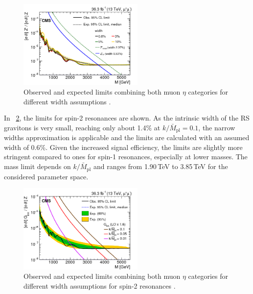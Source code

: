 \begin{figure}[htbp]
\centering
\includegraphics[width=0.55\textwidth]{Images/Cap5/Limit_mm_widths}
\caption{Observed and expected limits combining both muon $\eta$ categories for different width assumptions \cite{PAS}.}
\label{fig:limitWidths}
\end{figure}
 
In \figurename~\ref{fig:limitSpin2}, the limits for spin-2 resonances are shown. As the intrinsic width of the RS gravitons is very small, reaching only about 1.4\% at $k/\bar{M}_{\mathrm{pl}} = 0.1$, the narrow widths approximation is applicable and the limits are calculated with an assumed width of 0.6\%. Given the increased signal efficiency, the limits are slightly more stringent compared to ones for spin-1 resonances, especially at lower masses. The mass limit depends on $k/\bar{M}_{\mathrm{pl}}$ and ranges from 1.90\,TeV to 3.85\,TeV for the considered parameter space.

\begin{figure}[htbp]
\centering
\includegraphics[width=0.55\textwidth]{Images/Cap5/Limit_mm_RS}
\caption{Observed and expected limits combining both muon $\eta$ categories for different width assumptions for spin-2 resonances \cite{PAS}.}
\label{fig:limitSpin2}
\end{figure}
 
